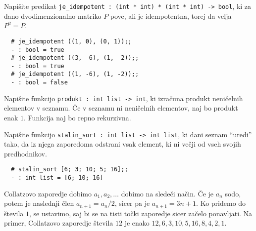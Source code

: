 \documentclass[arhiv]{../izpit}
\begin{document}
	


\naloga

\podnaloga
Napišite predikat \verb|je_idempotent : (int * int) * (int * int) -> bool|,
ki za dano dvodimenzionalno matriko $P$ pove, ali je idempotentna, torej
da velja $P^2 = P$.

  
\begin{verbatim}
  # je_idempotent ((1, 0), (0, 1));;
  - : bool = true
  # je_idempotent ((3, -6), (1, -2));;
  - : bool = true
  # je_idempotent ((1, -6), (1, -2));;
  - : bool = false
\end{verbatim}
  
\podnaloga
Napišite funkcijo \verb|produkt : int list -> int|, ki izračuna produkt neničelnih
elementov v seznamu. Če v seznamu ni neničelnih elementov, naj bo produkt enak $1$.
Funkcija naj bo repno rekurzivna.
  

\podnaloga
Napišite funkcijo \verb|stalin_sort : int list -> int list|, ki dani seznam ``uredi'' tako,
da iz njega zaporedoma odstrani vsak element, ki ni večji od vseh svojih predhodnikov.

\begin{verbatim}
  # stalin_sort [6; 3; 10; 5; 16];;
  - : int list = [6; 10; 16]
\end{verbatim}


\podnaloga
Collatzovo zaporedje dobimo $a_1, a_2, \dots$ dobimo na sledeči način. Če je $a_n$ sodo, potem je naslednji člen $a_{n + 1} = a_n / 2$, sicer pa je $a_{n + 1} = 3 n + 1$. Ko pridemo do števila $1$, se ustavimo, saj bi se na tisti točki zaporedje sicer začelo ponavljati. Na primer, Collatzovo zaporedje števila $12$ je enako $12, 6, 3, 10, 5, 16, 8, 4, 2, 1$. 
\end{document}
